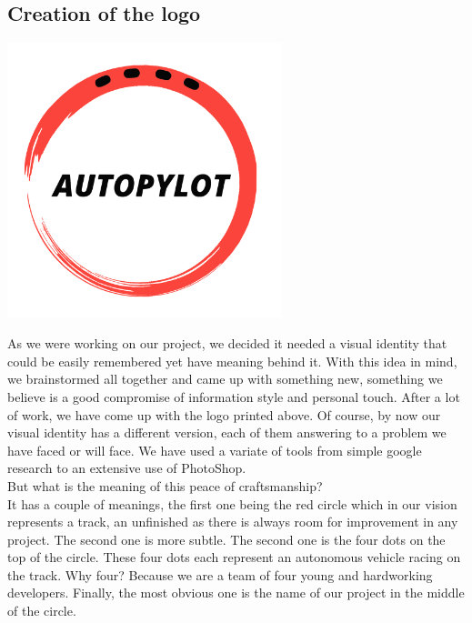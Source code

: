 \documentclass[12pt]{article}
\begin{document}
\subsection{Creation of the logo}
\centerline{\includegraphics[height=8cm]{../../logos/logo-transparent-black.png}}

As we were working on our project, we decided it needed a visual identity that could be easily remembered yet have meaning behind it. With this idea in mind, we brainstormed all together and came up with something new, something we believe is a good compromise of information style and personal touch. After a lot of work, we have come up with the logo printed above. Of course, by now our visual identity has a different version, each of them answering to a problem we have faced or will face. We have used a variate of tools from simple google research to an extensive use of PhotoShop.\\

But what is the meaning of this peace of craftsmanship?\\

It has a couple of meanings, the first one being the red circle which in our vision represents a track, an unfinished as there is always room for improvement in any project. The second one is more subtle. The second one is the four dots on the top of the circle. These four dots each represent an autonomous vehicle racing on the track. Why four? Because we are a team of four young and hardworking developers. Finally, the most obvious one is the name of our project in the middle of the circle. 

\end{document}
